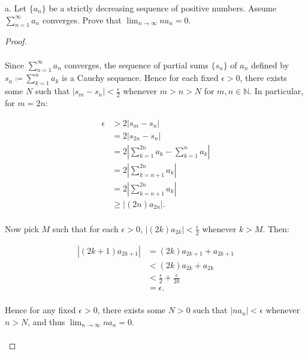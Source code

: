 a.  Let $\{a_n\}$ be a strictly decreasing sequence of positive numbers. Assume
    $\sum\limits_{n=1}^{\infty}{a_n}$ converges. Prove that
    $\lim_{n \rightarrow \infty}{na_n} = 0$.

    \begin{proof}\ \\\\
        Since $\sum\limits_{n=1}^{\infty}{a_n}$ converges, the sequence of
        partial sums $\{s_n\}$ of $a_n$ defined by
        $s_n \coloneqq \sum\limits_{k=1}^n{a_k}$ is a Cauchy sequence. Hence
        for each fixed $\epsilon > 0$, there exists some $N$ such that
        $|s_m - s_n| < \frac{\epsilon}{2}$ whenever
        $m > n > N$ for $m,n \in \mathbb{N}$.  In particular, for $m = 2n$:
    
        \begin{align*}
            \epsilon &> 2|s_m - s_n| \\
                     &= 2|s_{2n} - s_n| \\
                     &= 2\left|\sum\limits_{k=1}^{2n}{a_k} - \sum\limits_{k=1}^n{a_k}\right| \\
                     &= 2\left|\sum\limits_{k=n+1}^{2n}{a_k}\right| \\
                     &= 2\left|\sum\limits_{k=n+1}^{2n}{a_k}\right| \\
                     &\ge |(2n)a_{2n}|. \\
        \end{align*}

        Now pick $M$ such that for each $\epsilon > 0$,
        $|(2k)a_{2k}| < \frac{\epsilon}{2}$ whenever $k > M$. Then:

        \begin{align*}
            |(2k+1)a_{2k+1}| &= (2k)a_{2k+1} + a_{2k+1} \\
                             &< (2k)a_{2k} + a_{2k} \\
                             &< \frac{\epsilon}{2} + \frac{\epsilon}{2k} \\
                             &= \epsilon. \\
        \end{align*}

        Hence for any fixed $\epsilon > 0$, there exists some $N > 0$ such that
        $|na_n| < \epsilon$ whenever $n > N$, and thus
        $\lim_{n \rightarrow \infty}{na_n} = 0$.
        \\\\
    \end{proof}
    \pagebreak

